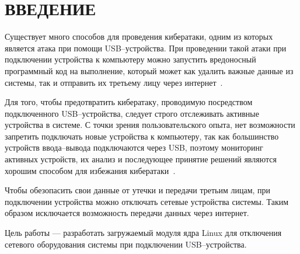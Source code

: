 \chapter*{ВВЕДЕНИЕ}

Существует много способов для проведения кибератаки, одним из которых является атака при помощи USB--устройства. При проведении такой атаки при подключении устройства к компьютеру можно запустить вредоносный программный код на выполнение, который может как удалить важные данные из системы, так и отправить их третьему лицу через интернет~\cite{usbmalware}.

Для того, чтобы предотвратить кибератаку, проводимую посредством подключенного USB--устройства, следует строго отслеживать активные устройства в системе. С точки зрения пользовательского опыта, нет возможности запретить подключать новые устройства к компьютеру, так как большинство устройств ввода--вывода подключаются через USB, поэтому мониторинг активных устройств, их анализ  и последующее принятие решений являются хорошим способом для избежания кибератаки~\cite{usbdrop}.

Чтобы обезопасить свои данные от утечки и передачи третьим лицам, при подключении устройства можно отключать сетевые устройства системы. Таким образом исключается возможность передачи данных через интернет.

Цель работы --- разработать загружаемый модуля ядра Linux для отключения сетевого оборудования системы при подключении USB--устройства.